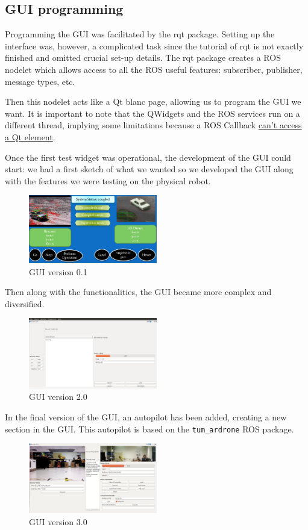 \documentclass[11pt,a4paper,twocolumn]{article}
\begin{document}
\subsection{GUI programming}
Programming the GUI was facilitated by the rqt package. Setting up the interface was, however,
 a complicated task since the tutorial of rqt is not exactly finished and omitted crucial set-up details. The rqt package creates a ROS nodelet which allows access to
all the ROS useful features: subscriber, publisher, message types, etc.

Then this nodelet acts like a Qt blanc page, allowing us to program the GUI we want. It is 
important to note that the QWidgets and the ROS services run on a different thread, implying some limitations because a ROS Callback
\href{http://wiki.ros.org/rqt/Tutorials/Writing\%20a\%20C\%2B\%2B\%20Plugin}
{can't access a Qt element}.

Once the first test widget was operational, the development of the GUI could start: we had a 
first sketch of what we wanted so we developed the GUI along with the features we were
testing on the physical robot.
\begin{figure}[ht]	
\centering
\includegraphics[width=0.5\textwidth]{guiSketch.png}
\caption{GUI version 0.1}
\end{figure}

Then along with the functionalities, the GUI became more complex and diversified.
\begin{figure}[ht]	
\centering
\includegraphics[width=0.5\textwidth]{guiV2.png}
\caption{GUI version 2.0}
\end{figure}

In the final version of the GUI, an autopilot has been added, creating a new section in the 
GUI. This autopilot is based on the \verb!tum_ardrone! ROS package.
\begin{figure}[ht]	
\centering
\includegraphics[width=0.5\textwidth]{guiV3.png}
\caption{GUI version 3.0}
\end{figure}
\end{document}
